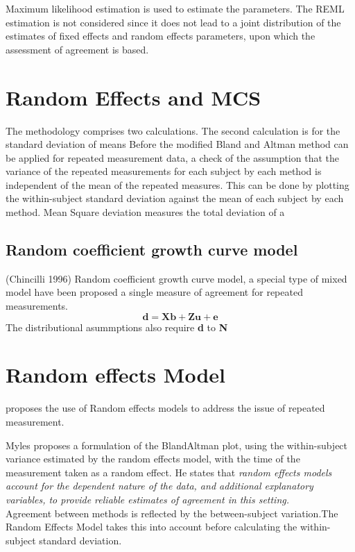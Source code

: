 \documentclass[12pt, a4paper]{report}
\theoremstyle{plain}
\theoremstyle{definition}
\theoremstyle{remark}
\begin{document}
Maximum likelihood estimation is used to estimate the parameters.
The REML estimation is not considered since it does not lead to a
joint distribution of the estimates of fixed effects and random
effects parameters, upon which the assessment of agreement is
based.

\section{Random Effects and MCS}
The methodology comprises two calculations. The second calculation
is for the standard deviation of means Before the modified Bland
and Altman method can be applied for repeated measurement data, a
check of the assumption that the variance of the repeated
measurements for each subject by each method is independent of the
mean of the repeated measures. This can be done by plotting the
within-subject standard deviation against the mean of each subject
by each method. Mean Square deviation measures the total deviation
of a


\subsection{Random coefficient growth curve model} (Chincilli
1996) Random coefficient growth curve model, a special type of
mixed model have been proposed a single measure of agreement for
repeated measurements.
\begin{equation}
\textbf{d}= \textbf{Xb} + \textbf{Zu} + \textbf{e}
\end{equation}
The distributional asummptions also require \textbf{d} to
\textbf{N}


\section{Random effects Model} \citet{Myles} proposes the use of
Random effects models to address the issue of repeated
measurement. 

Myles proposes a formulation of the BlandAltman
plot, using the within-subject variance estimated by the random
effects model, with the time of the measurement taken as a random
effect. He states that \emph{random effects models account for the
	dependent nature of the data, and additional explanatory
	variables, to provide reliable estimates of agreement in this
	setting.}
\\
Agreement between methods is reflected by the between-subject
variation.The Random Effects Model takes this into account before
calculating the within-subject standard deviation.
\end{document}
